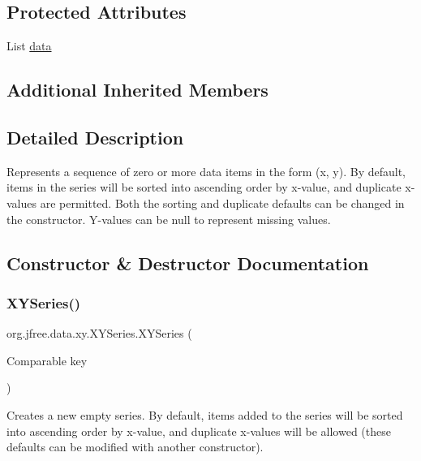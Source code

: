 \subsection*{Protected Attributes}
\begin{DoxyCompactItemize}
\item 
List \mbox{\hyperlink{classorg_1_1jfree_1_1data_1_1xy_1_1_x_y_series_aef5cd75ab29fa8abc27441a7bc7d1cf9}{data}}
\end{DoxyCompactItemize}
\subsection*{Additional Inherited Members}


\subsection{Detailed Description}
Represents a sequence of zero or more data items in the form (x, y). By default, items in the series will be sorted into ascending order by x-\/value, and duplicate x-\/values are permitted. Both the sorting and duplicate defaults can be changed in the constructor. Y-\/values can be {\ttfamily null} to represent missing values. 

\subsection{Constructor \& Destructor Documentation}
\mbox{\label{classorg_1_1jfree_1_1data_1_1xy_1_1_x_y_series_ab67e0945184ee334b3f77de7a61da618}} 
\subsubsection{\texorpdfstring{X\+Y\+Series()}{XYSeries()}\hspace{0.1cm}{\footnotesize\ttfamily [1/3]}}
{\footnotesize\ttfamily org.\+jfree.\+data.\+xy.\+X\+Y\+Series.\+X\+Y\+Series (\begin{DoxyParamCaption}\item[{Comparable}]{key }\end{DoxyParamCaption})}

Creates a new empty series. By default, items added to the series will be sorted into ascending order by x-\/value, and duplicate x-\/values will be allowed (these defaults can be modified with another constructor).



